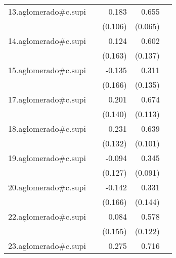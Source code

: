 {\begin{longtable}{l*{4}{D{.}{.}{-1}}}
\addlinespace
13.aglomerado#c.supi&                     &       0.183         &       0.655\sym{***}&                     \\
            &                     &     (0.106)         &     (0.065)         &                     \\
\addlinespace
14.aglomerado#c.supi&                     &       0.124         &       0.602\sym{***}&                     \\
            &                     &     (0.163)         &     (0.137)         &                     \\
\addlinespace
15.aglomerado#c.supi&                     &      -0.135         &       0.311\sym{*}  &                     \\
            &                     &     (0.166)         &     (0.135)         &                     \\
\addlinespace
17.aglomerado#c.supi&                     &       0.201         &       0.674\sym{***}&                     \\
            &                     &     (0.140)         &     (0.113)         &                     \\
\addlinespace
18.aglomerado#c.supi&                     &       0.231         &       0.639\sym{***}&                     \\
            &                     &     (0.132)         &     (0.101)         &                     \\
\addlinespace
19.aglomerado#c.supi&                     &      -0.094         &       0.345\sym{***}&                     \\
            &                     &     (0.127)         &     (0.091)         &                     \\
\addlinespace
20.aglomerado#c.supi&                     &      -0.142         &       0.331\sym{*}  &                     \\
            &                     &     (0.166)         &     (0.144)         &                     \\
\addlinespace
22.aglomerado#c.supi&                     &       0.084         &       0.578\sym{***}&                     \\
            &                     &     (0.155)         &     (0.122)         &                     \\
\addlinespace
23.aglomerado#c.supi&                     &       0.275\sym{*}  &       0.716\sym{***}&                     \\

\end{longtable}}
